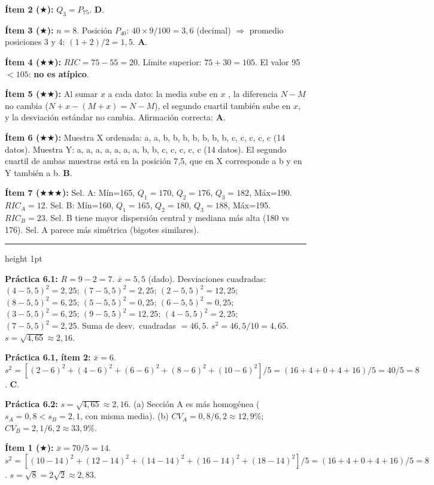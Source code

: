 \documentclass[11pt, letterpaper]{article}
\newcommand{\subbloque}[1]{%
  \vspace{14pt}
  \noindent{\large\bfseries\color{zenitnavy} #1}\par
  \vspace{4pt}\hrule height 1pt\vspace{8pt}}
\begin{document}
\textbf{Ítem 2 ($\bigstar$):}
$Q_3=P_{75}$. \textbf{D}.

\textbf{Ítem 3 ($\bigstar$):}
$n=8$. Posición $P_{40}$: $40\times9/100=3{,}6$ (decimal) $\Rightarrow$ promedio posiciones 3 y 4: $(1+2)/2=1{,}5$. \textbf{A}.

\textbf{Ítem 4 ($\bigstar\bigstar$):}
$RIC=75-55=20$. Límite superior: $75+30=105$. El valor 95 $< 105$: \textbf{no es atípico}.

\textbf{Ítem 5 ($\bigstar\bigstar$):}
Al sumar $x$ a cada dato: la media sube en $x$ \checkmark, la diferencia $N-M$ no cambia ($N+x-(M+x)=N-M$), el segundo cuartil también sube en $x$, y la desviación estándar no cambia. Afirmación correcta: \textbf{A}.

\textbf{Ítem 6 ($\bigstar\bigstar$):}
Muestra X ordenada: a, a, b, b, b, b, b, b, b, c, c, c, c, c (14 datos). Muestra Y: a, a, a, a, a, a, a, b, b, c, c, c, c, c (14 datos). El segundo cuartil de ambas muestras está en la posición 7{,}5, que en X corresponde a b y en Y también a b. \textbf{B}.

\textbf{Ítem 7 ($\bigstar\bigstar\bigstar$):}
Sel. A: Mín=165, $Q_1=170$, $Q_2=176$, $Q_3=182$, Máx=190. $RIC_A=12$.
Sel. B: Mín=160, $Q_1=165$, $Q_2=180$, $Q_3=188$, Máx=195. $RIC_B=23$.
Sel. B tiene mayor dispersión central y mediana más alta (180 vs 176). Sel. A parece más simétrica (bigotes similares).

\subbloque{Sección 6 --- Medidas de dispersión}

\textbf{Práctica 6.1:}
$R=9-2=7$. $\bar{x}=5{,}5$ (dado). Desviaciones cuadradas:
$(4{-}5{,}5)^2=2{,}25$; $(7{-}5{,}5)^2=2{,}25$; $(2{-}5{,}5)^2=12{,}25$; $(8{-}5{,}5)^2=6{,}25$;
$(5{-}5{,}5)^2=0{,}25$; $(6{-}5{,}5)^2=0{,}25$; $(3{-}5{,}5)^2=6{,}25$; $(9{-}5{,}5)^2=12{,}25$;
$(4{-}5{,}5)^2=2{,}25$; $(7{-}5{,}5)^2=2{,}25$.
Suma de desv.\ cuadradas $= 46{,}5$. $s^2=46{,}5/10=4{,}65$. $s=\sqrt{4{,}65}\approx2{,}16$.

\textbf{Práctica 6.1, ítem 2:}
$\bar{x}=6$. $s^2=[(2{-}6)^2+(4{-}6)^2+(6{-}6)^2+(8{-}6)^2+(10{-}6)^2]/5=(16+4+0+4+16)/5=40/5=8$. \textbf{C}.

\textbf{Práctica 6.2:}
$s=\sqrt{4{,}65}\approx2{,}16$.
(a) Sección A es más homogénea ($s_A=0{,}8<s_B=2{,}1$, con misma media).
(b) $CV_A=0{,}8/6{,}2\approx12{,}9\%$; $CV_B=2{,}1/6{,}2\approx33{,}9\%$.

\textbf{Ítem 1 ($\bigstar$):}
$\bar{x}=70/5=14$. $s^2=[(10{-}14)^2+(12{-}14)^2+(14{-}14)^2+(16{-}14)^2+(18{-}14)^2]/5=(16+4+0+4+16)/5=8$. $s=\sqrt{8}=2\sqrt{2}\approx2{,}83$.
\end{document}
